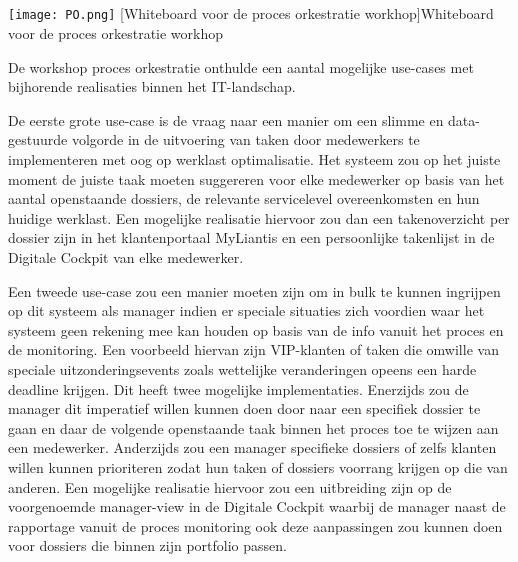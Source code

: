 \subsection{}%
\label{subsec:workshop proces orkestratie}
\begin{center}
  \captionsetup{type=figure}
  \texttt{[image: PO.png]}
  [Whiteboard voor de proces orkestratie workhop]{Whiteboard voor de proces orkestratie workhop}
\end{center}

De workshop proces orkestratie onthulde een aantal mogelijke use-cases met bijhorende realisaties binnen het IT-landschap. \newline

De eerste grote use-case is de vraag naar een manier om een slimme en data-gestuurde volgorde in de uitvoering van taken door medewerkers te implementeren met oog op werklast optimalisatie. Het systeem zou op het juiste moment de juiste taak moeten suggereren voor elke medewerker op basis van het aantal openstaande dossiers, de relevante servicelevel overeenkomsten en hun huidige werklast. Een mogelijke realisatie hiervoor zou dan een takenoverzicht per dossier zijn in het klantenportaal MyLiantis en een persoonlijke takenlijst in de Digitale Cockpit van elke medewerker. \newline

Een tweede use-case zou een manier moeten zijn om in bulk te kunnen ingrijpen op dit systeem als manager indien er speciale situaties zich voordien waar het systeem geen rekening mee kan houden op basis van de info vanuit het proces en de monitoring. Een voorbeeld hiervan zijn VIP-klanten of taken die omwille van speciale uitzonderingsevents zoals wettelijke veranderingen opeens een harde deadline krijgen. Dit heeft twee mogelijke implementaties. Enerzijds zou de manager dit imperatief willen kunnen doen door naar een specifiek dossier te gaan en daar de volgende openstaande taak binnen het proces toe te wijzen aan een medewerker. Anderzijds zou een manager specifieke dossiers of zelfs klanten willen kunnen prioriteren zodat hun taken of dossiers voorrang krijgen op die van anderen. Een mogelijke realisatie hiervoor zou een uitbreiding zijn op de voorgenoemde manager-view in de Digitale Cockpit waarbij de manager naast de rapportage vanuit de proces monitoring ook deze aanpassingen zou kunnen doen voor dossiers die binnen zijn portfolio passen. \newline

